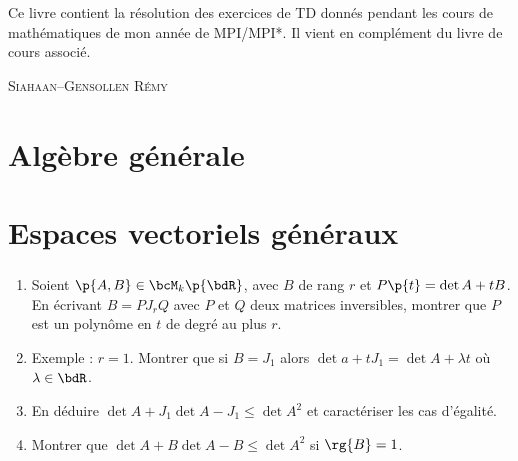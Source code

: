\documentclass[a4paper,french,bookmarks]{book}
\begin{document}
    \newline\newline\newline
    
    \begin{center}
        \begin{minipage}{0.85\linewidth}
            \large \qquad Ce livre contient la résolution des exercices de TD donnés pendant les cours de mathématiques de mon année de MPI/MPI*. Il vient en complément du livre de cours associé.\newline\newline\newline\text{}
        \end{minipage}
    \end{center}
    
    \hfill{\large\textsc{Siahaan--Gensollen Rémy}}
    
    \pagestyle{intro}
    
    
    \newpage
    \dominitoc\nomtcrule 
    {\sffamily\tableofcontents}\mtcaddchapter\pagestyle{toc}
    
    \cleardoublepage
    
    
    \pagestyle{plain}
    
    \chapter{Algèbre générale}
    
    \chapter{Espaces vectoriels généraux}
    
    \subsection{}
    
    \begin{enumerate}
        \item Soient $\p{A, B} \in \bcM_k\p{\bdR}$, avec $B$ de rang $r$ et $P\p{t} = \det{A + tB}$. En écrivant $B = PJ_rQ$ avec $P$ et $Q$ deux matrices inversibles, montrer que $P$ est un polynôme en $t$ de degré au plus $r$.
        
        \item Exemple : $r = 1$. Montrer que si $B = J_1$ alors $\det{a + tJ_1} = \det{A} + \lambda t$ où $\lambda \in \bdR$.
        
        \item En déduire $\det{A + J_1}\det{A - J_1} \leq \det{A^2}$ et caractériser les cas d'égalité.
        
        \item Montrer que $\det{A + B}\det{A - B} \leq \det{A}^2$ si $\rg{B} = 1$.
    \end{enumerate}
    
\end{document}
